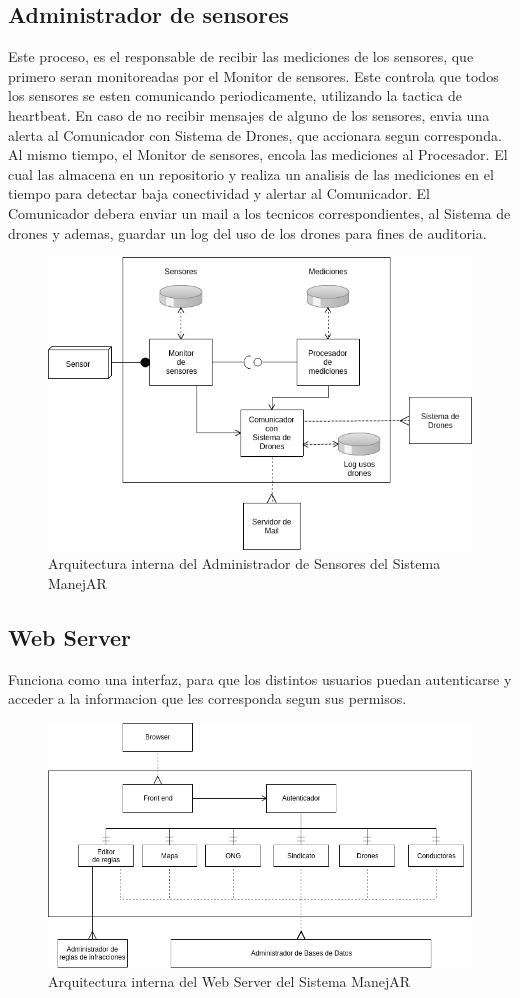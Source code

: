 \subsection{Administrador de sensores}
Este proceso, es el responsable de recibir las mediciones de los sensores, que 
primero seran monitoreadas por el Monitor de sensores. Este controla que todos 
los sensores se esten comunicando periodicamente, utilizando la tactica de 
heartbeat. En caso de no recibir mensajes de alguno de los sensores, envia una 
alerta al Comunicador con Sistema de Drones, que accionara segun corresponda.
Al mismo tiempo, el Monitor de sensores, encola las mediciones al Procesador. El 
cual las almacena en un repositorio y realiza un analisis de las mediciones en 
el tiempo para detectar baja conectividad y alertar al Comunicador.
El Comunicador debera enviar un mail a los tecnicos correspondientes, al Sistema 
de drones y ademas, guardar un log del uso de los drones para fines de 
auditoria.


\begin{figure}
\centerline{\includegraphics[width=1\textwidth]{./imagenes/arquitectura_tp2/administrador_sensores.png}}
\caption{Arquitectura interna del Administrador de Sensores del Sistema ManejAR}
\end{figure}


\subsection{Web Server}
Funciona como una interfaz, para que los distintos usuarios puedan autenticarse 
y acceder a la informacion que les corresponda segun sus permisos.


\begin{figure}
\centerline{\includegraphics[width=1\textwidth]{./imagenes/arquitectura_tp2/web_server.png}}
\caption{Arquitectura interna del Web Server del Sistema ManejAR}
\end{figure}
